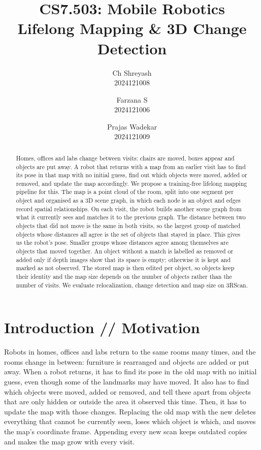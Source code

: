 \documentclass[11pt, a4paper]{article}
\title{
  \large\textnormal{CS7.503: Mobile Robotics}\\[0.5em]
  \LARGE\textbf{\color{darkblue}Lifelong Mapping \& 3D Change Detection}
}
\author{
  Ch Shreyash \\ 2024121008
  \and
  Farzana S \\ 2024121006
  \and
  Prajas Wadekar \\ 2024121009
}
\date{}
\begin{document}
\maketitle

\begin{abstract}

  \noindent Homes, offices and labs change between visits: chairs are moved, boxes appear and objects are put away. A robot that returns with a map from an earlier visit has to find its pose in that map with no initial guess, find out which objects were moved, added or removed, and update the map accordingly. We propose a training-free lifelong mapping pipeline for this. The map is a point cloud of the room, split into one segment per object and organised as a 3D scene graph, in which each node is an object and edges record spatial relationships. On each visit, the robot builds another scene graph from what it currently sees and matches it to the previous graph. The distance between two objects that did not move is the same in both visits, so the largest group of matched objects whose distances all agree is the set of objects that stayed in place. This gives us the robot's pose. Smaller groups whose distances agree among themselves are objects that moved together. An object without a match is labelled as removed or added only if depth images show that its space is empty; otherwise it is kept and marked as not observed. The stored map is then edited per object, so objects keep their identity and the map size depends on the number of objects rather than the number of visits. We evaluate relocalization, change detection and map size on 3RScan.
\end{abstract}

\section{Introduction // Motivation}

Robots in homes, offices and labs return to the same rooms many times, and the rooms change in between: furniture is rearranged and objects are added or put away. When a robot returns, it has to find its pose in the old map with no initial guess, even though some of the landmarks may have moved. It also has to find which objects were moved, added or removed, and tell these apart from objects that are only hidden or outside the area it observed this time. Then, it has to update the map with those changes. Replacing the old map with the new deletes everything that cannot be currently seen, loses which object is which, and moves the map's coordinate frame. Appending every new scan keeps outdated copies and makes the map grow with every visit.
\end{document}
